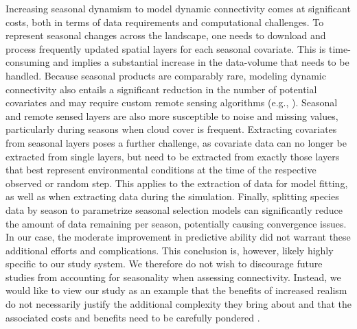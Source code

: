 \documentclass[../FinalThesis.tex]{subfiles}
\begin{document}
Increasing seasonal dynamism to model dynamic connectivity comes at significant
costs, both in terms of data requirements and computational challenges. To
represent seasonal changes across the landscape, one needs to download and
process frequently updated spatial layers for each seasonal covariate. This is
time-consuming and implies a substantial increase in the data-volume that needs
to be handled. Because seasonal products are comparably rare, modeling dynamic
connectivity also entails a significant reduction in the number of potential
covariates and may require custom remote sensing algorithms (e.g.,
). Seasonal and remote sensed layers are also more
susceptible to noise and missing values, particularly during seasons when cloud
cover is frequent. Extracting covariates from seasonal layers poses a further
challenge, as covariate data can no longer be extracted from single layers, but
need to be extracted from exactly those layers that best represent environmental
conditions at the time of the respective observed or random step. This applies
to the extraction of data for model fitting, as well as when extracting data
during the simulation. Finally, splitting species data by season to parametrize
seasonal selection models can significantly reduce the amount of data remaining
per season, potentially causing convergence issues. In our case, the moderate
improvement in predictive ability did not warrant these additional efforts and
complications. This conclusion is, however, likely highly specific to our study
system. We therefore do not wish to discourage future studies from accounting
for seasonality when assessing connectivity. Instead, we would like to view our
study as an example that the benefits of increased realism do not necessarily
justify the additional complexity they bring about and that the associated costs
and benefits need to be carefully pondered \citep{Puy.2022}.

\end{document}
